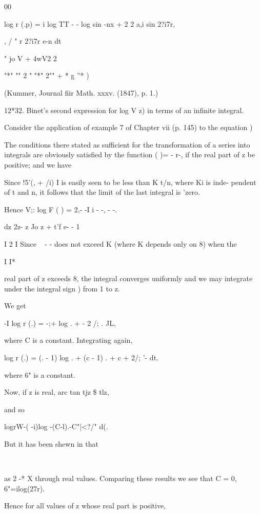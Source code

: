00

log r (.p) = i log TT - - log sin -nx + 2 2 a,i sin 2?i7r,

, / " r 2?i7r e-n dt

" jo V + 4wV2 2%

"*" "" 2 " "*" 2"" + * g ''* )

(Kummer, Journal fiir Math. xxxv. (1847), p. 1.)

12*32. Binet's second expression for log V z) in terms of an infinite
integral.

Consider the application of example 7 of Chapter vii (p. 145) to the
equation )

The conditions there stated as sufficient for the transformation of a
series into integrals are obviously satisfied by the function ( )= -
r-, if the real part of z be positive; and we have

Since !5'(, + /i) I is easily seen to be less than K t/n, where Ki is
inde- pendent of t and n, it follows that the limit of the last
integral is 'zero.

Hence V;: log F ( ) = 2,- -I i - -, - -.

dz 2z- z Jo z + t'f e- - 1

I 2 I Since ~ - - does not exceed K (where K depends only on 8) when
the

I I*

real part of z exceeds 8, the integral converges uniformly and we may
integrate under the integral sign ) from 1 to z.

We get

-I log r (.) = -;+ log . + - 2 /; . JL,

where C is a constant. Integrating again,

log r (.) = (. - 1) log . + (c - 1) . + c + 2/; '- dt.

where 6" is a constant.

%
%

Now, if z is real, arc tan tjz \$ tlz,

and so

logrW-( -i)log -(C-l).-C"|<?/" d(.

But it has been shewn in that

\ \ %

as 2 -* X through real values. Comparing these results we see that C =
0, 6"=ilog(27r).

Hence for all values of z whose real part is positive,


